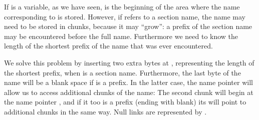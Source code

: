 If  is a  variable, as we have seen,
 is the beginning of the area where the name
corresponding to  is stored.  However, if  refers to a section
name, the name may need to be stored in chunks, because it may
``grow'': a prefix of the section name may be encountered before
the full name.  Furthermore we need to know the length of the shortest
prefix of the name that was ever encountered.

We solve this problem by inserting two extra bytes at ,
representing the length of the shortest prefix, when  is a
section name. Furthermore, the last byte of the name will be a blank
space if  is a prefix. In the latter case, the name pointer
 will allow us to access additional chunks of the name:
The second chunk will begin at the name pointer ,
and if it too is a prefix (ending with blank) its  will point
to additional chunks in the same way. Null links are represented by
.

